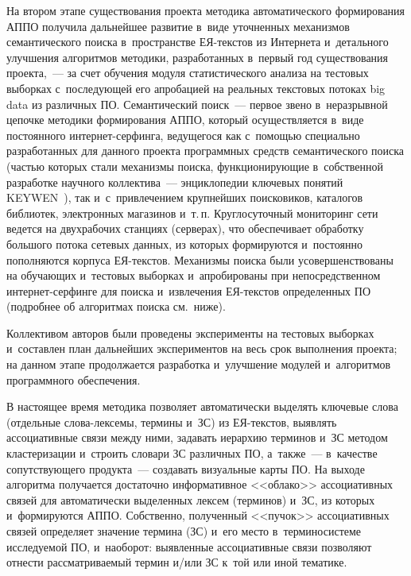 \begin{multicols}{2}
     На втором этапе существования проекта методика автоматического
формирования АППО получила дальнейшее развитие в~виде уточненных
механизмов семантического поиска в~пространстве ЕЯ-текс\-тов из
Интернета и~детального улучшения алгоритмов методики, разработанных в~первый год существования проекта,~--- за счет обучения модуля
статистического анализа на тестовых выборках с~последующей его
апробацией на реальных текстовых потоках big data из различных ПО.
Семантический поиск~--- первое звено в~неразрывной цепочке методики
формирования АППО, который осуществляется в~виде постоянного
интернет-серфинга, ведущегося как с~помощью специально разработанных
для данного проекта программных средств семантического поиска (частью
которых стали механизмы поиска, функционирующие в~собственной
разработке научного коллектива~--- энциклопедии ключевых понятий
KEYWEN~\cite{11-koz, 10-koz, 12-koz}), так и~с~привлечением крупнейших
поисковиков, каталогов библиотек, электронных магазинов и~т.\,п.
Круглосуточный мониторинг сети ведется на двух\linebreak рабочих станциях
(серверах), что обеспечивает обработ\-ку большого потока сетевых данных, из
которых формируются и~постоянно пополняются корпуса ЕЯ-текс\-тов.
Механизмы поиска были усовершенствованы на обучающих и~тестовых
выборках и~апробированы при непосредственном ин\-тер\-нет-сер\-фин\-ге
для поиска и~извлечения ЕЯ-текс\-тов определенных ПО
(подробнее об алгоритмах поиска см.\ ниже).

     Коллективом авторов были проведены эксперименты на тестовых
выборках и~составлен план дальнейших экспериментов на весь срок
выполнения проекта; на данном этапе продолжается разработка и~улучшение
модулей и~алгоритмов программного обеспечения.

     В настоящее время методика позволяет автоматически выделять
ключевые слова (отдельные сло\-ва-лек\-се\-мы, термины и~ЗС) из
     ЕЯ-текс\-тов, выявлять ассоциативные связи между ними, задавать
иерархию терминов и~ЗС методом кластеризации и~строить словари ЗС
различных ПО, а~также~--- в~качестве сопутствующего
продукта~--- создавать визуальные карты ПО. На выходе алгоритма получается
достаточно информативное <<облако>> ассоциативных связей для
автоматически выделенных лексем (терминов) и~ЗС, из которых и~формируются АППО.
Собственно, полученный <<пучок>> ассоциативных связей определяет
значение термина (ЗС) и~его место в~терминосистеме исследуемой
ПО, и~наоборот: выявленные ассоциативные связи
позволяют отнести рассматриваемый термин и/или ЗС к~той или иной
тематике.


\end{multicols}
